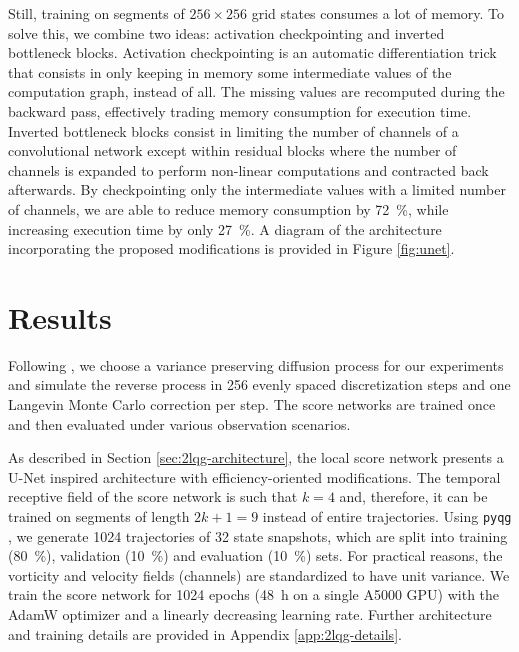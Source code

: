 Still, training on segments of $256 \times 256$ grid states consumes a lot of memory. To solve this, we combine two ideas: activation checkpointing and inverted bottleneck blocks. Activation checkpointing \cite{chen2016training, gruslys2016memoryefficient} is an automatic differentiation trick that consists in only keeping in memory some intermediate values of the computation graph, instead of all. The missing values are recomputed during the backward pass, effectively trading memory consumption for execution time. Inverted bottleneck blocks \cite{sandler2018mobilenetv2, liu2022convnet} consist in limiting the number of channels of a convolutional network except within residual blocks where the number of channels is expanded to perform non-linear computations and contracted back afterwards. By checkpointing only the intermediate values with a limited number of channels, we are able to reduce memory consumption by \qty{72}{\percent}, while increasing execution time by only \qty{27}{\percent}. A diagram of the architecture incorporating the proposed modifications is provided in Figure \ref{fig:unet}.

\section{Results}

Following \textcite{rozet2023scorebased}, we choose a variance preserving diffusion process for our experiments and simulate the reverse process in 256 evenly spaced discretization steps and one Langevin Monte Carlo correction per step. The score networks are trained once and then evaluated under various observation scenarios.

As described in Section \ref{sec:2lqg-architecture}, the local score network presents a U-Net \cite{ronneberger2015unet} inspired architecture with efficiency-oriented modifications. The temporal receptive field of the score network is such that $k = 4$ and, therefore, it can be trained on segments of length $2k + 1 = 9$ instead of entire trajectories. Using \texttt{pyqg} \cite{abernathey2022pyqg}, we generate 1024 trajectories of 32 state snapshots, which are split into training (\qty{80}{\percent}), validation (\qty{10}{\percent}) and evaluation (\qty{10}{\percent}) sets. For practical reasons, the vorticity and velocity fields (channels) are standardized to have unit variance. We train the score network for 1024 epochs (\qty{48}{h} on a single A5000 GPU) with the AdamW \cite{loshchilov2019decoupled} optimizer and a linearly decreasing learning rate. Further architecture and training details are provided in Appendix \ref{app:2lqg-details}.

